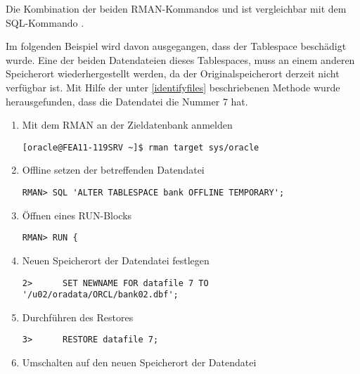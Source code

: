           Die Kombination der beiden RMAN-Kommandos  und  ist vergleichbar mit dem SQL-Kommando .

          Im folgenden Beispiel wird davon ausgegangen, dass der Tablespace  beschädigt wurde. Eine der beiden Datendateien dieses Tablespaces, muss an einem anderen Speicherort wiederhergestellt werden, da der Originalspeicherort derzeit nicht verfügbar ist. Mit Hilfe der unter \ref{identifyfiles} beschriebenen Methode wurde herausgefunden, dass die Datendatei  die Nummer 7 hat.
          \begin{enumerate}
            \item Mit dem RMAN an der Zieldatenbank anmelden
              \begin{lstlisting}[caption={An der Zieldatenbank anmelden},label=admin1479,language=rman]
[oracle@FEA11-119SRV ~]$ rman target sys/oracle
              \end{lstlisting}
            \item Offline setzen der betreffenden Datendatei
              \begin{lstlisting}[caption={Betreffende Datendatei Offline setzen},label=admin1480,language=rman,emph={[9]ALTER,TABLESPACE,OFFLINE,TEMPORARY},emphstyle={[9]\color{magenta}\bfseries}]
RMAN> SQL 'ALTER TABLESPACE bank OFFLINE TEMPORARY';
              \end{lstlisting}
            \item Öffnen eines RUN-Blocks
            \begin{lstlisting}[caption={Einen RUN-Block öffnen},label=admin1481,language=rman]
RMAN> RUN {
            \end{lstlisting}
            \item Neuen Speicherort der Datendatei festlegen
            \begin{lstlisting}[caption={Neuen Speicherort festlegen},label=admin1482,language=rman]
2>      SET NEWNAME FOR datafile 7 TO '/u02/oradata/ORCL/bank02.dbf';
            \end{lstlisting}
            \item Durchführen des Restores
            \begin{lstlisting}[caption={Restore durchführen},label=admin1483,language=rman]
3>      RESTORE datafile 7;
            \end{lstlisting}
            \item Umschalten auf den neuen Speicherort der Datendatei

\end{enumerate}
